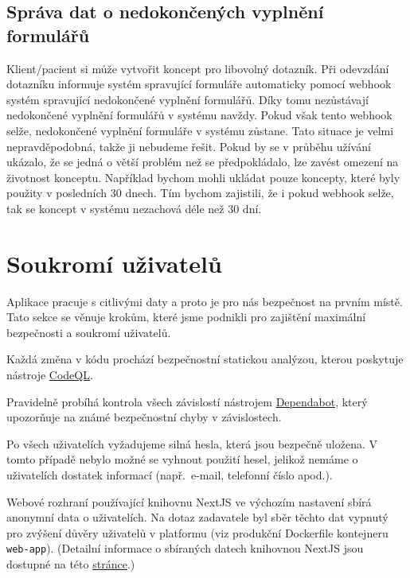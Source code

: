\subsection{Správa dat o nedokončených vyplnění formulářů}\label{subsec:sprava-dat-o-nedokoncenych-vyplneni-formularu}

Klient/pacient si může vytvořit koncept pro libovolný dotazník.
Při odevzdání dotazníku informuje systém spravující formuláře automaticky pomocí webhook systém spravující nedokončené vyplnění formulářů.
Díky tomu nezůstávají nedokončené vyplnění formulářů v systému navždy.
Pokud však tento webhook selže, nedokončené vyplnění formuláře v systému zůstane.
Tato situace je velmi nepravděpodobná, takže ji nebudeme řešit.
Pokud by se v průběhu užívání ukázalo, že se jedná o větší problém než se předpokládalo, lze zavést omezení na životnost konceptu.
Například bychom mohli ukládat pouze koncepty, které byly použity v posledních 30 dnech.
Tím bychom zajistili, že i pokud webhook selže, tak se koncept v systému nezachová déle než 30 dní.


\section{Soukromí uživatelů}\label{sec:soukromi-uzivatelu}

Aplikace pracuje s citlivými daty a proto je pro nás bezpečnost na prvním místě.
Tato sekce se věnuje krokům, které jsme podnikli pro zajištění maximální bezpečnosti a soukromí uživatelů.

Každá změna v kódu prochází bezpečnostní statickou analýzou, kterou poskytuje nástroje \href{https://codeql.github.com/}{CodeQL}.

Pravidelně probíhá kontrola všech závislostí nástrojem \href{https://github.com/dependabot}{Dependabot}, který upozorňuje na známé bezpečnostní chyby v závislostech.

Po všech uživatelích vyžadujeme silná hesla, která jsou bezpečně uložena.
V tomto případě nebylo možné se vyhnout použití hesel, jelikož nemáme o uživatelích dostatek informací (např.\ e-mail, telefonní číslo apod.).

Webové rozhraní používající knihovnu NextJS ve výchozím nastavení sbírá anonymní data o uživatelích.
Na dotaz zadavatele byl sběr těchto dat vypnutý pro zvýšení důvěry uživatelů v platformu (viz produkční Dockerfile kontejneru \texttt{web-app}).
(Detailní informace o sbíraných datech knihovnou NextJS jsou dostupné na této \href{https://nextjs.org/telemetry}{stránce}.)

